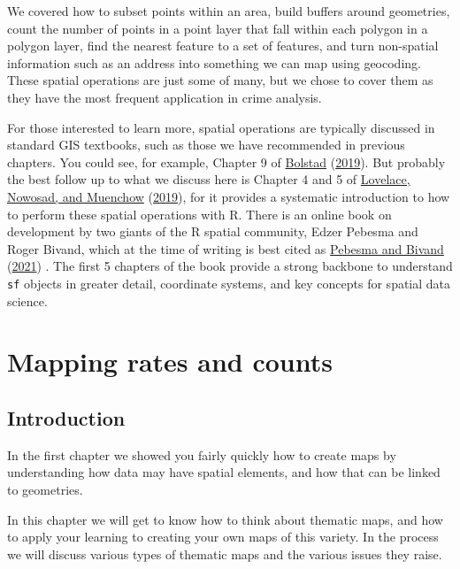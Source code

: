 \documentclass[
]{book}
\begin{document}
We covered how to subset points within an area, build buffers around geometries, count the number of points in a point layer that fall within each polygon in a polygon layer, find the nearest feature to a set of features, and turn non-spatial information such as an address into something we can map using geocoding. These spatial operations are just some of many, but we chose to cover them as they have the most frequent application in crime analysis.

For those interested to learn more, spatial operations are typically discussed in standard GIS textbooks, such as those we have recommended in previous chapters. You could see, for example, Chapter 9 of \protect\hyperlink{ref-Bolstad_2019}{Bolstad} (\protect\hyperlink{ref-Bolstad_2019}{2019}). But probably the best follow up to what we discuss here is Chapter 4 and 5 of \protect\hyperlink{ref-Lovelace_2019}{Lovelace, Nowosad, and Muenchow} (\protect\hyperlink{ref-Lovelace_2019}{2019}), for it provides a systematic introduction to how to perform these spatial operations with R. There is an online book on development by two giants of the R spatial community, Edzer Pebesma and Roger Bivand, which at the time of writing is best cited as \protect\hyperlink{ref-Pebesma_2021}{Pebesma and Bivand} (\protect\hyperlink{ref-Pebesma_2021}{2021}) . The first 5 chapters of the book provide a strong backbone to understand \texttt{sf} objects in greater detail, coordinate systems, and key concepts for spatial data science.

\hypertarget{mapping-rates-and-counts}{%
\chapter{Mapping rates and counts}\label{mapping-rates-and-counts}}

\hypertarget{introduction-2}{%
\section{Introduction}\label{introduction-2}}

In the first chapter we showed you fairly quickly how to create maps by understanding how data may have spatial elements, and how that can be linked to geometries.

In this chapter we will get to know how to think about thematic maps, and how to apply your learning to creating your own maps of this variety. In the process we will discuss various types of thematic maps and the various issues they raise.
\end{document}

